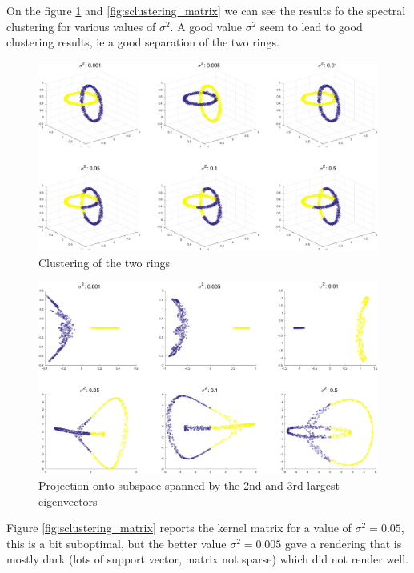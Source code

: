 \documentclass[11pt, a4paper]{article}
\begin{document}
On the figure \ref{fig:sclustering_origcl} and
\ref{fig:sclustering_matrix} we can see the results fo the spectral
clustering for various values of $\sigma^2$. A good value $\sigma^2$
seem to lead to good clustering results, ie a good separation of the
two rings.

\begin{figure}[H]
  \vspace{-10pt}
  \centering
  \includegraphics[scale=.35]{sclustering_origcl.pdf}
  \caption{Clustering of the two rings}
  \label{fig:sclustering_origcl}
\end{figure}

\begin{figure}[H]
  \centering
  \includegraphics[scale=.35]{sclustering_origcl2.pdf}
  \caption{Projection onto subspace spanned by the 2nd and 3rd largest
    eigenvectors}
  \label{fig:sclustering_origcl2}
\end{figure}

Figure \ref{fig:sclustering_matrix} reports the kernel matrix for a
value of $\sigma^2=0.05$, this is a bit suboptimal, but the better
value $\sigma^2=0.005$ gave a rendering that is mostly dark (lots of
support vector, matrix not sparse) which did not render well. 
\end{document}
